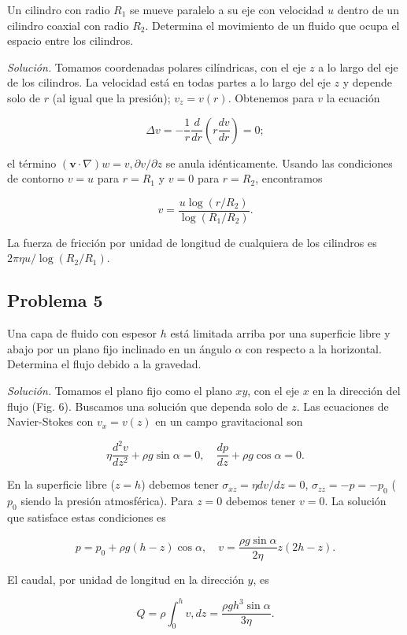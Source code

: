 \documentclass{article}
\begin{document}
Un cilindro con radio $R_1$ se mueve paralelo a su eje con velocidad $u$ dentro de un cilindro coaxial con radio $R_2$. Determina el movimiento de un fluido que ocupa el espacio entre los cilindros.

\textit{Solución.} Tomamos coordenadas polares cilíndricas, con el eje $z$ a lo largo del eje de los cilindros. La velocidad está en todas partes a lo largo del eje $z$ y depende solo de $r$ (al igual que la presión); $v_z = v(r)$. Obtenemos para $v$ la ecuación

$$
\Delta v = -\frac{1}{r} \frac{d}{dr} \left( r \frac{dv}{dr} \right) = 0;
$$

el término $(\mathbf{v} \cdot \nabla)w = v , \partial v/\partial z$ se anula idénticamente. Usando las condiciones de contorno $v = u$ para $r = R_1$ y $v = 0$ para $r = R_2$, encontramos

$$
v = \frac{u \log(r/R_2)}{\log(R_1/R_2)}.
$$

La fuerza de fricción por unidad de longitud de cualquiera de los cilindros es $2\pi \eta u/\log(R_2/R_1)$.

\subsection*{Problema 5}

Una capa de fluido con espesor $h$ está limitada arriba por una superficie libre y abajo por un plano fijo inclinado en un ángulo $\alpha$ con respecto a la horizontal. Determina el flujo debido a la gravedad.

\textit{Solución.} Tomamos el plano fijo como el plano $xy$, con el eje $x$ en la dirección del flujo (Fig. 6). Buscamos una solución que dependa solo de $z$. Las ecuaciones de Navier-Stokes con $v_x = v(z)$ en un campo gravitacional son

$$
\eta \frac{d^2 v}{dz^2} + \rho g \sin \alpha = 0, \quad \frac{dp}{dz} + \rho g \cos \alpha = 0.
$$

En la superficie libre ($z = h$) debemos tener $\sigma_{xz} = \eta dv/dz = 0$, $\sigma_{zz} = -p = -p_0$ ($p_0$ siendo la presión atmosférica). Para $z = 0$ debemos tener $v = 0$. La solución que satisface estas condiciones es

$$
p = p_0 + \rho g (h - z) \cos \alpha, \quad v = \frac{\rho g \sin \alpha}{2\eta} z(2h - z).
$$

El caudal, por unidad de longitud en la dirección $y$, es

$$
Q = \rho \int_0^h v , dz = \frac{\rho g h^3 \sin \alpha}{3\eta}.
$$
\end{document}
